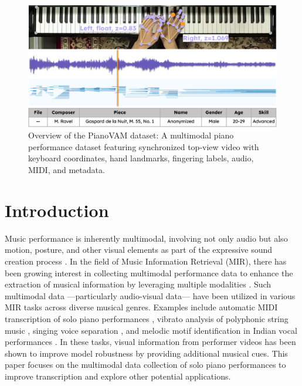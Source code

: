 \documentclass{article}
\begin{document}
\begin{figure}
    \centering
    \includegraphics[width=1\linewidth]{Images/teaser_image.png}
    \caption{Overview of the PianoVAM dataset: A multimodal piano performance dataset featuring synchronized top-view video with keyboard coordinates, hand landmarks, fingering labels, audio, MIDI, and metadata.}
    \label{fig:enter-label}
\vspace{-5mm}    
\end{figure}

\section{Introduction}\label{sec:introduction}


Music performance is inherently multimodal, involving not only audio but also motion, posture, and other visual elements as part of the expressive sound creation process \cite{PPR09Bergeron, MusicPercep12Platz}. In the field of Music Information Retrieval (MIR), there has been growing interest in collecting multimodal performance data to enhance the extraction of musical information by leveraging multiple modalities \cite{TMM18Li, IEEE19Duan}. Such multimodal data ---particularly audio-visual data--- have been utilized in various MIR tasks across diverse musical genres. Examples include automatic MIDI transcription of solo piano performances \cite{ICASSP20Koepke, ICASSPW23Li}, vibrato analysis of polyphonic string music \cite{SMC17Li}, singing voice separation \cite{BMVC21Montesinos}, and melodic motif identification in Indian vocal performances \cite{TISMIR24Nadkarni}. In these tasks, visual information from performer videos has been shown to improve model robustness by providing additional musical cues. This paper focuses on the multimodal data collection of solo piano performances to improve transcription and explore other potential applications.  
\end{document}
